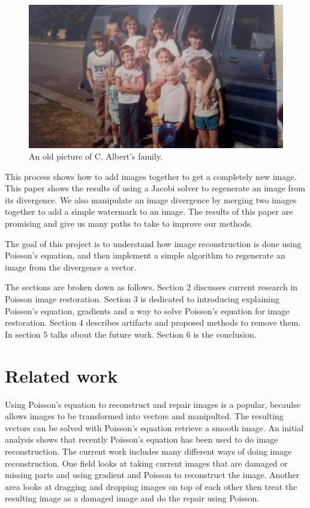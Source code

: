 \documentclass[10pt,twopage]{acmsiggraph}
\begin{document}
\begin{figure}
\centering
\includegraphics[width=.44\textwidth]{fig/family.jpg}
\caption{An old picture of C. Albert's family.}
\label{family}
\end{figure}


This process shows how to add images together to get a completely new image. This paper shows the results of using a Jacobi solver to regenerate an image from its divergence. We also manipulate an image divergence by merging two images together to add a simple watermark to an image. The results of this paper are promising and give us many paths to take to improve our methods.

The goal of this project is to understand how image reconstruction is done using Poisson's equation, and then implement a simple algorithm to regenerate an image from the divergence a vector. 

The sections are broken down as follows. Section 2 discusses current research in Poisson image restoration. Section 3 is dedicated to introducing explaining Poisson's equation, gradients and a way to solve Poisson's equation for image restoration. Section 4 describes artifacts and proposed methods to remove them. In section 5 talks about the future work. Section 6 is the conclusion.


\section{Related work}
\label{relatedWork}
Using Poisson's equation to reconstruct and repair images is a popular, becaulse allows images to be transformed into vectors and manipulted. The resulting vectors can be solved with Poisson's equation retrieve a smooth image. An initial analysis shows that recently \cite{Bertalmio} Poisson's equation has been used to do image reconstruction. The current work includes many different ways of doing image reconstruction. One field looks at taking current images that are damaged or missing parts and using gradient and Poisson to reconstruct the image. Another area looks at dragging and dropping images on top of each other then treat the resulting image as a damaged image and do the repair using Poisson.
\end{document}
